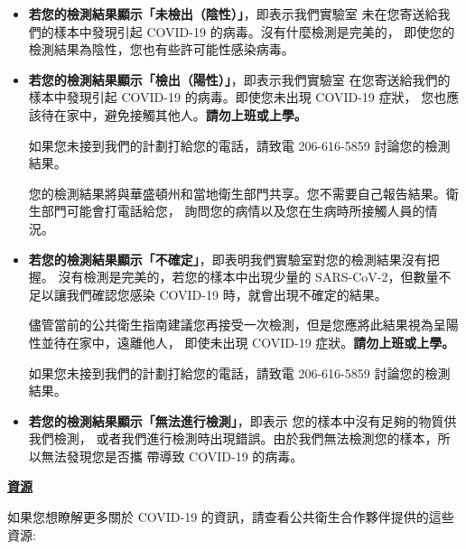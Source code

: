 \documentclass[10pt]{article}
\begin{document}
\begin{itemize}


\item

  \textbf{若您的檢測結果顯示「未檢出（陰性）」}，即表示我們實驗室
  未在您寄送給我們的樣本中發現引起 COVID-19 的病毒。沒有什麼檢測是完美的，
  即使您的檢測結果為陰性，您也有些許可能性感染病毒。

\item

  \textbf{若您的檢測結果顯示「檢出（陽性）」}，即表示我們實驗室
  在您寄送給我們的樣本中發現引起 COVID-19 的病毒。即使您未出現 COVID-19 症狀，
  您也應該待在家中，避免接觸其他人。\textbf{請勿上班或上學。}

  如果您未接到我們的計劃打給您的電話，請致電 206-616-5859 討論您的檢測結果。


  您的檢測結果將與華盛頓州和當地衛生部門共享。您不需要自己報告結果。衛生部門可能會打電話給您，
  詢問您的病情以及您在生病時所接觸人員的情況。

\item

  \textbf{若您的檢測結果顯示「不確定」}，即表明我們實驗室對您的檢測結果沒有把握。
  沒有檢測是完美的，若您的樣本中出現少量的 SARS-CoV-2，但數量不足以讓我們確認您感染 COVID-19
  時，就會出現不確定的結果。

  儘管當前的公共衛生指南建議您再接受一次檢測，但是您應將此結果視為呈陽性並待在家中，遠離他人，
  即使未出現 COVID-19 症狀。\textbf{請勿上班或上學。}

  如果您未接到我們的計劃打給您的電話，請致電 206-616-5859 討論您的檢測結果。



\item

  \textbf{若您的檢測結果顯示「無法進行檢測」}，即表示 您的樣本中沒有足夠的物質供我們檢測，
  或者我們進行檢測時出現錯誤。由於我們無法檢測您的樣本，所以無法發現您是否攜 帶導致 COVID-19
  的病毒。

\end{itemize}

\bigskip

\large \underline{\textbf{資源}}

如果您想瞭解更多關於 COVID-19 的資訊，請查看公共衛生合作夥伴提供的這些資源:
\end{document}
